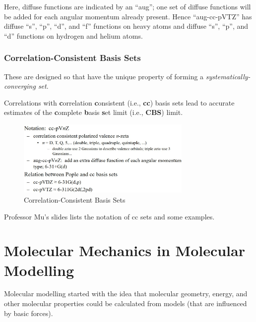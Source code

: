 \documentclass[
  letterpaper,
  DIV=11,
  numbers=noendperiod]{scrreprt}
\begin{document}
Here, diffuse functions are indicated by an ``aug''; one set of diffuse
functions will be added for each angular momentum already present. Hence
``aug-cc-pVTZ'' has diffuse ``s'', ``p'', ``d'', and ``f'' functions on
heavy atoms and diffuse ``s'', ``p'', and ``d'' functions on hydrogen
and helium atoms.

\hypertarget{correlation-consistent-basis-sets}{%
\subsection{Correlation-Consistent Basis
Sets}\label{correlation-consistent-basis-sets}}

These are designed so that have the unique property of forming a
\emph{systematically-converging set}.

Correlations with \textbf{c}orrelation \textbf{c}onsistent (i.e.,
\textbf{cc}) basis sets lead to accurate estimates of the
\textbf{c}omplete \textbf{b}asis \textbf{s}et limit (i.e., \textbf{CBS})
limit.

\begin{figure}

{\centering \includegraphics[width=3.31in,height=\textheight]{./images/wk2a/cc.jpg}

}

\caption{Correlation-Consistent Basis Sets}

\end{figure}

Professor Mu's slides lists the notation of cc sets and some examples.

\hypertarget{molecular-mechanics-in-molecular-modelling-1}{%
\chapter{Molecular Mechanics in Molecular
Modelling}\label{molecular-mechanics-in-molecular-modelling-1}}

Molecular modelling started with the idea that molecular geometry,
energy, and other molecular properties could be calculated from models
(that are influenced by basic forces).
\end{document}
